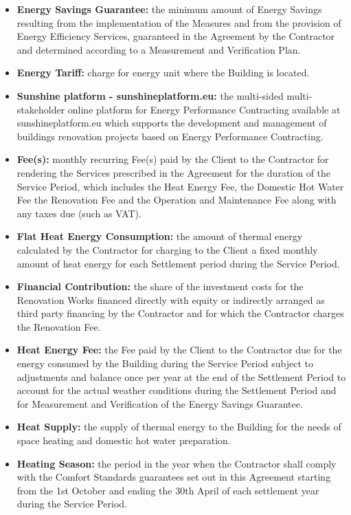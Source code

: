 \begin{multicols}{2}
\begin{itemize}[label={}]
	\item\textbf{Energy Savings Guarantee:} the minimum amount of Energy Savings resulting from the implementation of the Measures and from the provision of Energy Efficiency Services, guaranteed in the Agreement by the Contractor and determined according to a Measurement and Verification Plan.
	\item\textbf{Energy Tariff:} charge for energy unit where the Building is located.
	\item\textbf{Sunshine platform - sunshineplatform.eu:} the multi-sided multi-stakeholder online platform for Energy Performance Contracting available at sunshineplatform.eu which supports the development and management of buildings renovation projects based on Energy Performance Contracting.
	\item\textbf{Fee(s):} monthly recurring Fee(s) paid by the Client to the Contractor for rendering the Services prescribed in the Agreement for the duration of the Service Period, which includes the Heat Energy Fee, the Domestic Hot Water Fee the Renovation Fee and the Operation and Maintenance Fee along with any taxes due (such as VAT).
	\item\textbf{Flat Heat Energy Consumption:}  the amount of thermal energy calculated by the Contractor for charging to the Client a fixed monthly amount of heat energy for each Settlement period during the Service Period.
	\item\textbf{Financial Contribution:} the share of the investment costs for the Renovation Works financed directly with equity or indirectly arranged as third party financing by the Contractor and for which the Contractor charges the Renovation Fee.
	\item\textbf{Heat Energy Fee:} the Fee paid by the Client to the Contractor due for the energy consumed by the Building during the Service Period subject to adjustments and balance once per year at the end of the Settlement Period to account for the actual weather conditions during the Settlement Period and for Measurement and Verification of the Energy Savings Guarantee.
	\item\textbf{Heat Supply:} the supply of thermal energy to the Building for the needs of space heating and domestic hot water preparation.
	\item\textbf{Heating Season:} the period in the year when the Contractor shall comply with the Comfort Standards guarantees set out in this Agreement starting from the 1st October and ending the 30th April of each settlement year during the Service Period.

\end{itemize}
\end{multicols}
